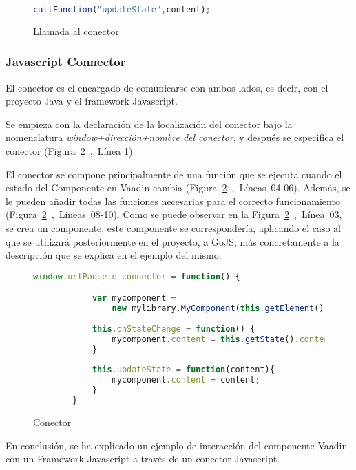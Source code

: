 \begin{figure}[!tb]
	\centering
	\begin{lstlisting}[language=JavaScript]
	callFunction("updateState",content);
	\end{lstlisting}
	\caption{Llamada al conector}
	\label{fig:callfunction}
\end{figure}
 			
 			
 			
 	\subsubsection{Javascript Connector}	
 	
 	
 	El conector es el encargado de comunicarse con ambos lados, es decir, con el proyecto Java y el framework Javascript.
 	
 	Se empieza con la declaración de la localización del conector bajo la nomenclatura \emph{window+dirección+nombre del conector}, y después se especifica el conector (Figura~\ref{fig:conectorDesc}~,~Línea 1).
 	
 	El conector se compone principalmente de una función que se ejecuta cuando el estado del Componente en Vaadin cambia (Figura~\ref{fig:conectorDesc}~,~Líneas~04-06). Además, se le pueden añadir todas las funciones necesarias para el correcto funcionamiento (Figura~\ref{fig:conectorDesc}~,~Líneas~08-10). Como se puede observar en la Figura~\ref{fig:conectorDesc}~,~Línea~03, se crea un componente, este componente se correspondería, aplicando el caso al que se utilizará posteriormente en el proyecto, a GoJS, más concretamente a la descripción que se explica en el ejemplo del mismo.
 	
 	
 	\begin{figure}[!tb]
 		\centering
 		\begin{lstlisting}[language=JavaScript]
 		window.urlPaquete_connector = function() {

 			var mycomponent = 
 			    new mylibrary.MyComponent(this.getElement());
		 	
		 	this.onStateChange = function() {
		 		mycomponent.content = this.getState().content;
		 	}
		 	
		 	this.updateState = function(content){
		 		mycomponent.content = content;
		 	}
	 	}
 		\end{lstlisting}
 		\caption{Conector}
 		\label{fig:conectorDesc}
 	\end{figure}

	En conclusión, se ha explicado un ejemplo de interacción del componente Vaadin con un Framework Javascript a través de un conector Javascript.
 	
 	
 	
 			